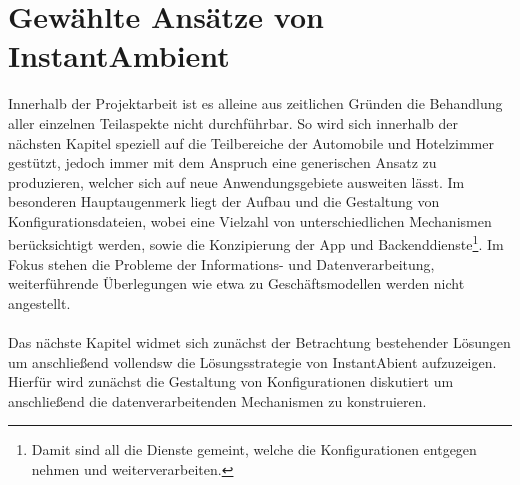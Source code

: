 \section{Gewählte Ansätze von InstantAmbient}
Innerhalb der Projektarbeit ist es alleine aus zeitlichen Gründen die Behandlung aller einzelnen Teilaspekte nicht durchführbar. So wird sich innerhalb der nächsten Kapitel 
speziell auf die Teilbereiche der Automobile und Hotelzimmer gestützt, jedoch immer mit dem Anspruch eine generischen Ansatz zu produzieren, welcher sich auf neue 
Anwendungsgebiete ausweiten lässt. Im besonderen Hauptaugenmerk liegt der Aufbau und die Gestaltung von Konfigurationsdateien, wobei eine Vielzahl von unterschiedlichen 
Mechanismen berücksichtigt werden, sowie die Konzipierung der App und Backenddienste\footnote{Damit sind all die Dienste gemeint, welche die Konfigurationen entgegen nehmen 
und weiterverarbeiten.}. Im Fokus stehen die Probleme der Informations- und Datenverarbeitung, weiterführende Überlegungen wie etwa zu Geschäftsmodellen werden nicht 
angestellt. 
\\\\
Das nächste Kapitel widmet sich zunächst der Betrachtung bestehender Lösungen um anschließend vollendsw die Lösungsstrategie von InstantAbient aufzuzeigen. Hierfür wird 
zunächst die Gestaltung von Konfigurationen diskutiert um anschließend die datenverarbeitenden Mechanismen zu konstruieren. 

